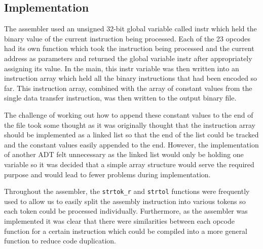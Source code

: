 \documentclass[11pt]{article}
\begin{document}
\subsection{Implementation}

The assembler used an unsigned 32-bit global variable called instr which held the binary value of the current instruction being processed. Each of the 23 opcodes had its own function which took the instruction being processed and the current address as parameters and returned the global variable instr after appropriately assigning its value. In the main, this instr variable was then written into an instruction array which held all the binary instructions that had been encoded so far. This instruction array, combined with the array of constant values from the single data transfer instruction, was then written to the output binary file.

The challenge of working out how to append these constant values to the end of the file took some thought as it was originally thought that the instruction array should be implemented as a linked list so that the end of the list could be tracked and the constant values easily appended to the end. However, the implementation of another ADT felt unnecessary as the linked list would only be holding one variable so it was decided that a simple array structure would serve the required purpose and would lead to fewer problems during implementation.

Throughout the assembler, the \texttt{strtok\_r} and \texttt{strtol} functions were frequently used to allow us to easily split the assembly instruction into various tokens so each token could be processed individually. Furthermore, as the assembler was implemented it was clear that there were similarities between each opcode function for a certain instruction which could be compiled into a more general function to reduce code duplication.
\end{document}

